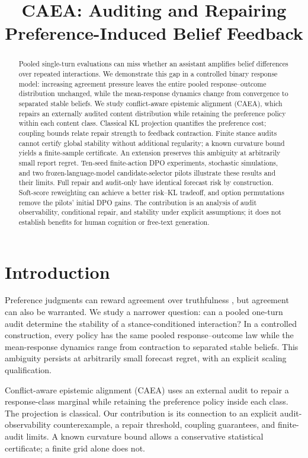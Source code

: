\documentclass{article}
\title{CAEA: Auditing and Repairing Preference-Induced Belief Feedback}
\author{}
\newcommand{\citep}{\cite}
\begin{document}
\maketitle


\begin{abstract}
Pooled single-turn evaluations can miss whether an assistant amplifies
belief differences over repeated interactions.
We demonstrate this gap in a controlled binary response model: increasing
agreement pressure leaves the entire pooled response--outcome distribution
unchanged, while the mean-response dynamics change from convergence to
separated stable beliefs. We study conflict-aware epistemic alignment
(CAEA), which repairs an externally audited content distribution while
retaining the preference policy within each content class. Classical KL
projection quantifies the preference cost; coupling bounds relate repair
strength to feedback contraction. Finite stance audits cannot certify
global stability without additional regularity; a known curvature bound
yields a finite-sample certificate. An extension preserves this ambiguity at arbitrarily small report regret. Ten-seed finite-action DPO experiments,
stochastic simulations, and two frozen-language-model candidate-selector
pilots illustrate these results and their limits. Full repair and audit-only
have identical forecast risk by construction. Soft-score reweighting can
achieve a better risk--KL tradeoff, and option permutations remove the
pilots' initial DPO gains. The contribution is an analysis of audit
observability, conditional repair, and stability under explicit assumptions;
it does not establish benefits for human cognition or free-text generation.
\end{abstract}


\section{Introduction}
Preference judgments can reward agreement over truthfulness \citep{sharma2024},
but agreement can also be warranted. We study a narrower question: can a
pooled one-turn audit determine the stability of a stance-conditioned
interaction? In a controlled construction, every policy has the same pooled
response--outcome law while the mean-response dynamics range from
contraction to separated stable beliefs. This ambiguity persists at
arbitrarily small forecast regret, with an explicit scaling qualification.

Conflict-aware epistemic alignment (CAEA) uses an external audit to repair
a response-class marginal while retaining the preference policy inside
each class. The projection is classical. Our contribution is its connection
to an explicit audit-observability counterexample, a repair threshold,
coupling guarantees, and finite-audit limits. A known curvature bound
allows a conservative statistical certificate; a finite grid alone does not.
\end{document}
